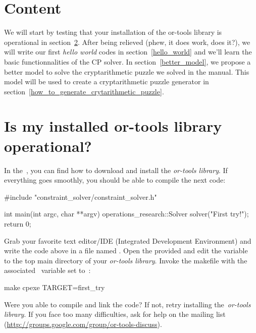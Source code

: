 \documentclass[]{article}
\begin{document}
\maketitle
\tableofcontents
\thispagestyle{fancy} 
\section{Content}
We will start by testing that your installation of the or-tools library is operational in section~\ref{working_settings}.
After being relieved (phew, it does work, does it?), we will write our first \emph{hello world} codes in section~\ref{hello_world} and we'll learn the basic functionnalities of the CP solver. In section~\ref{better_model}, we propose a better model to solve the cryptarithmetic puzzle we solved in the manual. This model will be used to create a cryptarithmetic puzzle generator in section~\ref{how_to_generate_crytarithmetic_puzzle}.

\section{Is my installed or-tools library operational?}
\label{working_settings}

In the~, you can find how to download and install the \emph{or-tools library}. If everything goes smoothly, you should be able to compile the next code:

\begin{cppcode}
#include "constraint_solver/constraint_solver.h"

int main(int argc, char **argv) {
  operations_research::Solver solver("First try!");
  return 0;
}
\end{cppcode}

\begin{exercise}
 Grab your favorite text editor/IDE (Integrated Development Environment) and write the code above in a file named . Open the provided  and edit the variable~ to the top main directory of your \emph{or-tools library}. Invoke the makefile with the associated~ variable set to~:
\begin{bashcode}
make cpexe TARGET=first_try
\end{bashcode}
\vspace{-0.8cm}
\end{exercise}

Were you able to compile and link the code? If not, retry installing the~\emph{or-tools library}. If you face too many difficulties, ask for help on the mailing list (\url{http://groups.google.com/group/or-tools-discuss}).
\end{document}
